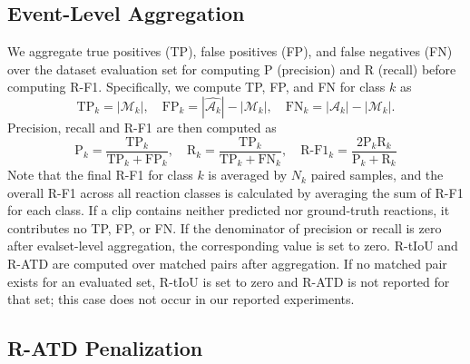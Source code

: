 \subsection{Event-Level Aggregation}
\label{app:event_level_aggregation}

We aggregate true positives (TP), false positives (FP), and false negatives (FN) over the dataset evaluation set for computing P (precision) and R (recall) before computing R-F1. Specifically, we compute TP, FP, and FN for class $k$ as
\begin{equation}
    \text{TP}_k=|\mathcal{M}_k|, \quad
    \text{FP}_k=|\widehat{\mathcal{A}_k}|-|\mathcal{M}_k|, \quad
    \text{FN}_k=|\mathcal{A}_k|-|\mathcal{M}_k|.
\end{equation}
Precision, recall and R-F1 are then computed as
\begin{equation}
    \text{P}_k=\frac{\text{TP}_k}{\text{TP}_k+\text{FP}_k}, \quad
    \text{R}_k=\frac{\text{TP}_k}{\text{TP}_k+\text{FN}_k}, \quad
    \text{R-F1}_k=\frac{2\text{P}_k\text{R}_k}{\text{P}_k+\text{R}_k}
\end{equation}
Note that the final R-F1 for class $k$ is averaged by $N_k$ paired samples, and the overall R-F1 across all reaction classes is calculated by averaging the sum of R-F1 for each class. If a clip contains neither predicted nor ground-truth reactions, it contributes no TP, FP, or FN. If the denominator of precision or recall is zero after evalset-level aggregation, the corresponding value is set to zero. R-tIoU and R-ATD are computed over matched pairs after aggregation. If no matched pair exists for an evaluated set, R-tIoU is set to zero and R-ATD is not reported for that set; this case does not occur in our reported experiments.

\subsection{R-ATD Penalization}
\label{app:ratd_computation}


